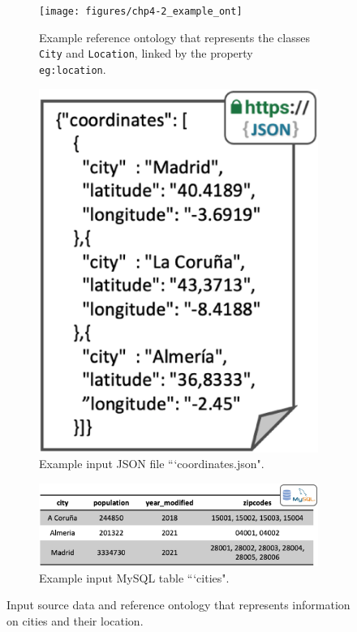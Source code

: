 \begin{figure}[b!]
    \centering
    \begin{subfigure}[b]{0.45\linewidth}
        \centering
    	\texttt{[image: figures/chp4-2\_example\_ont]}
    	\caption{Example reference ontology that represents the classes \texttt{City} and \texttt{Location}, linked by the property \texttt{eg:location}.}
    	\label{fig:chp4-2_chp4_ex_onto}
    \end{subfigure}
    \begin{subfigure}[b]{0.28\linewidth}
        \centering
    	\includegraphics[width=1\linewidth]{figures/chp4-2_example_json}
    	\caption{Example input JSON file ```coordinates.json".}
    	\label{fig:chp4-2_chp4_ex_json}
    \end{subfigure}
    \begin{subfigure}[b]{0.7\linewidth}
        \centering
    	\includegraphics[width=1\linewidth]{figures/chp4-2_example_rdb}
    	\caption{Example input MySQL table ```cities".}
    	\label{fig:chp4-2_chp4_ex_rdb}
    \end{subfigure}
    \caption[Example data and ontology about cities for CM mapping]{Input source data and reference ontology that represents information on cities and their location.}
    \label{fig:chp4-2_chp4_ex_input}
\end{figure}
